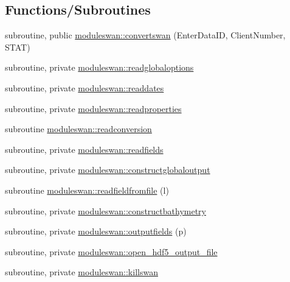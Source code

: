 \subsection*{Functions/\+Subroutines}
\begin{DoxyCompactItemize}
\item 
subroutine, public \mbox{\hyperlink{namespacemoduleswan_aa4916273cc3ac0c249fd48ef574161b3}{moduleswan\+::convertswan}} (Enter\+Data\+ID, Client\+Number, S\+T\+AT)
\item 
subroutine, private \mbox{\hyperlink{namespacemoduleswan_a98f6d123b6575342a8d84ba663e5a265}{moduleswan\+::readglobaloptions}}
\item 
subroutine, private \mbox{\hyperlink{namespacemoduleswan_a21f8abfb6ba4a1cd70fcffe134d3cc55}{moduleswan\+::readdates}}
\item 
subroutine, private \mbox{\hyperlink{namespacemoduleswan_a15e0f14f5229674aebdd25f0a49a7df2}{moduleswan\+::readproperties}}
\item 
subroutine \mbox{\hyperlink{namespacemoduleswan_ad7b64582ddb44426de0dd83c9c0b9b42}{moduleswan\+::readconversion}}
\item 
subroutine, private \mbox{\hyperlink{namespacemoduleswan_a247f3ff2e64affcc137e817aadef34dc}{moduleswan\+::readfields}}
\item 
subroutine, private \mbox{\hyperlink{namespacemoduleswan_a8d797caa947f1c5d987ee4c2132ce350}{moduleswan\+::constructglobaloutput}}
\item 
subroutine \mbox{\hyperlink{namespacemoduleswan_a3ba6a86cf192c42aac83c6a40c7addbc}{moduleswan\+::readfieldfromfile}} (l)
\item 
subroutine, private \mbox{\hyperlink{namespacemoduleswan_ae97863dddc759a89a93ecb9148e2ef90}{moduleswan\+::constructbathymetry}}
\item 
subroutine, private \mbox{\hyperlink{namespacemoduleswan_a2d1606342b5a9024053f2fceb16ae444}{moduleswan\+::outputfields}} (p)
\item 
subroutine, private \mbox{\hyperlink{namespacemoduleswan_a857ac03cf8baadbf286cb5fb151b21fc}{moduleswan\+::open\+\_\+hdf5\+\_\+output\+\_\+file}}
\item 
subroutine, private \mbox{\hyperlink{namespacemoduleswan_a649aac26c71119742c249a918e913f5e}{moduleswan\+::killswan}}
\end{DoxyCompactItemize}
